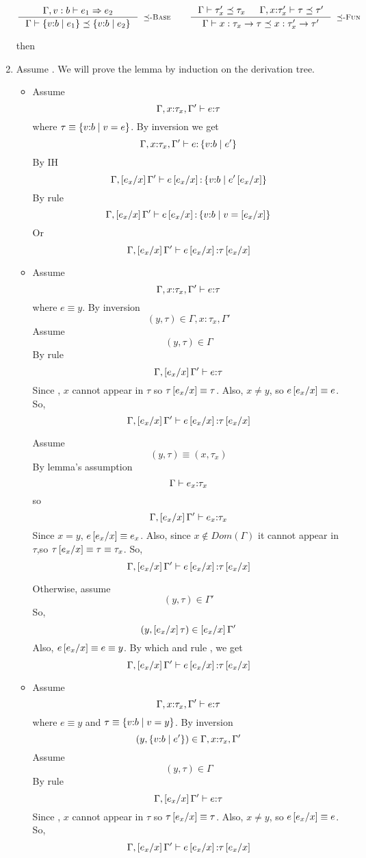 \begin{enumerate}
$$
\inference{
	\issubref{\Gamma, v:b}{e_1}{e_2}
}{
	\issubtype{\Gamma}{\tref{v}{b}{e_1}}{\tref{v}{b}{e_2}}
}[\rsubbase]
\qquad
\inference{
	\issubtype{\Gamma}{\tau'_x}{\tau_x} &&
	\issubtype{\Gamma, x \colon \tau'_x}{\tau}{\tau'}
}{
	\issubtype{\Gamma}{x:\tau_x \rightarrow \tau}{x:\tau'_x \rightarrow \tau'}
}[\rsubfun]
$$

	
	then
\item \label{proof:sub:type} 
Assume 
	.
We will prove the lemma by induction on the derivation tree.
\begin{itemize}
\item \rtexact Assume
	$$\hastype{\Gamma, x\colon\tau_x, \Gamma'}{e}{\tau}$$
where $\tau \equiv \tref{v}{b}{v = e}$.
By inversion we get
	$$\hastype{\Gamma, x\colon\tau_x, \Gamma'}{e}{\tref{v}{b}{e'}}$$
By IH
	$$\hastype{\Gamma, \sub{x}{e_x} \Gamma'}{e\sub{x}{e_x}}{\tref{v}{b}{e'\sub{x}{e_x}}}$$
By rule \rtexact
	$$\hastype{\Gamma, \sub{x}{e_x} \Gamma'}{e\sub{x}{e_x}}{\tref{v}{b}{v = \sub{x}{e_x}}}$$
Or
	$$\hastype{\Gamma, \sub{x}{e_x} \Gamma'}{e\sub{x}{e_x}}{\tau\sub{x}{e_x}}$$
\item \rtvar Assume 
	$$\hastype{\Gamma, x\colon\tau_x, \Gamma'}{e}{\tau}$$
where $e \equiv y$.
By inversion 
$$(y,\tau )\in \Gamma, x\colon\tau_x, \Gamma'$$
Assume
$$(y,\tau)\in \Gamma$$
By rule \rtvar
$$\hastype{\Gamma,\sub{x}{e_x}\Gamma'}{e}{\tau}$$
Since \iswellformed{}{\Gamma}, $x$ cannot appear in $\tau$
so $\tau\sub{x}{e_x}\equiv\tau$.
Also, $x\neq y$, so $e\sub{x}{e_x}\equiv e$.
So,
$$\hastype{\Gamma,\sub{x}{e_x}\Gamma'}{e\sub{x}{e_x}}{\tau\sub{x}{e_x}}$$

Assume
$$(y,\tau) \equiv (x,\tau _x)$$
By lemma's assumption 
$$\hastype{\Gamma}{e_x}{\tau_x}$$
so
$$\hastype{\Gamma,\sub{x}{e_x}\Gamma'}{e_x}{\tau_x}$$
Since $x = y$, $e\sub{x}{e_x} \equiv e_x$.
Also, since $x \notin Dom(\Gamma)$ 
it cannot appear in $\tau$,so
$\tau\sub{x}{e_x} \equiv \tau \equiv \tau_x$.
So,
$$\hastype{\Gamma,\sub{x}{e_x}\Gamma'}{e\sub{x}{e_x}}{\tau\sub{x}{e_x}}$$

Otherwise, assume
$$(y,\tau)\in \Gamma'$$
So,
$$(y,\sub{x}{e_x}\tau)\in \sub{x}{e_x}\Gamma'$$
Also, $e\sub{x}{e_x}\equiv e \equiv y$.
By which and rule \rtvar, we get
$$\hastype{\Gamma,\sub{x}{e_x}\Gamma'}{e\sub{x}{e_x}}{\tau\sub{x}{e_x}}$$

\item \rtvarbase
Assume 
	$$\hastype{\Gamma, x\colon\tau_x, \Gamma'}{e}{\tau}$$
where $e \equiv y$ and $\tau\equiv\tref{v}{b}{v=y}$.
By inversion 
$$(y,\tref{v}{b}{e'})\in \Gamma, x\colon\tau_x, \Gamma'$$
Assume
$$(y,\tau)\in \Gamma$$
By rule \rtvarbase
$$\hastype{\Gamma,\sub{x}{e_x}\Gamma'}{e}{\tau}$$
Since \iswellformed{}{\Gamma}, $x$ cannot appear in $\tau$
so $\tau\sub{x}{e_x}\equiv\tau$.
Also, $x\neq y$, so $e\sub{x}{e_x}\equiv e$.
So,
$$\hastype{\Gamma,\sub{x}{e_x}\Gamma'}{e\sub{x}{e_x}}{\tau\sub{x}{e_x}}$$


\end{itemize}
\end{enumerate}
